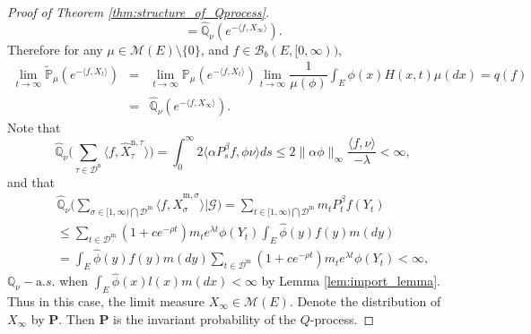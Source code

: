 \documentclass[12pt,a4paper]{amsart}
\numberwithin{equation}{section}
\theoremstyle{plain}
\theoremstyle{definition}
\begin{document}
{\begin{proof}[Proof of Theorem \ref{thm:structure_of_Qprocess}]
\begin{equation*}
    =\widehat{\mathbb Q}_{\nu}\left(e^{-\langle f, X_{\infty}\rangle }\right).
  \end{equation*}
  Therefore for any $\mu\in\mathcal M(E)\setminus\{0\}$, and $f\in\mathcal B_b(E,[0,\infty))$,
  \begin{eqnarray*}
    \lim_{t\rightarrow\infty}\widetilde{\mathbb P}_\mu\left(e^{-\langle f, X_t\rangle}\right)&=&\lim_{t\rightarrow\infty}\mathbb P_\mu\left(e^{-\langle f, X_t\rangle}\right)
                                                                                                 \lim_{t\to\infty}\dfrac{1}{\mu(\phi)}\int_E\phi(x)H(x, t)\mu(dx)=q(f)\\
                                                                                             &=&\widehat{\mathbb Q}_{\nu}\left(e^{-\langle f, X_{\infty}\rangle }\right).
  \end{eqnarray*}
  Note that
  \[
    \widehat{\mathbb Q}_{\nu}\big(\sum_{\tau\in \mathcal D^{\mathrm n}}\langle f, \widehat X_{\tau}^{{\mathrm n},\tau} \rangle \big)=\int_0^\infty2\langle \alpha P^{\beta}_sf,\phi\nu\rangle ds
    \leq 2\|\alpha\phi\|_\infty\dfrac{\langle f,\nu\rangle }{-\lambda}<\infty,
  \]
  and that
  \begin{eqnarray*}
    &&\widehat{\mathbb Q}_{\nu}\Big(\sum_{\sigma\in [1,\infty)\bigcap\mathcal D^{\mathrm m}}\langle f, \widehat X_{\sigma}^{{\mathrm m},\sigma} \rangle|\mathcal G \Big)
       =\sum_{t\in [1,\infty)\bigcap\mathcal D^{\mathrm m}}m_tP^{\beta}_tf( Y_t)\\
    &&\leq \sum_{t\in \mathcal D^{\mathrm m}}(1+ce^{-\rho t})m_te^{\lambda t}
       \phi(Y_t)\int_E\widehat\phi(y)f(y)m(dy)\\
    &&=\int_E\widehat\phi(y)f(y)m(dy) \sum_{t\in \mathcal D^{\mathrm m}}(1+ce^{-\rho t})m_te^{\lambda t}\phi(Y_t)<\infty,
  \end{eqnarray*}
  $\mathbb Q_{\nu}-{\mathrm a.s.}$ when $\int_E\widehat\phi(x)l(x)m(dx)<\infty$ by Lemma \ref{lem:import_lemma}.
  Thus in this case, the limit measure $X_\infty\in \mathcal M(E)$.  Denote the distribution of $X_\infty$ by $\mathbf P$.  Then $\mathbf P$
  is the invariant probability of the $Q$-process.



\end{proof}}
\end{document}

